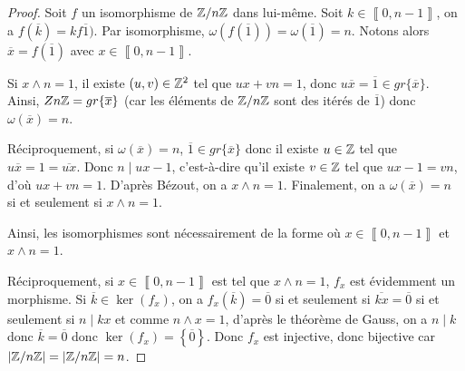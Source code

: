 \documentclass[12pt]{article}
\begin{document}
\begin{proof}
	Soit $f$ un isomorphisme de $\mathbb{Z}/n\mathbb{Z}$ dans lui-même. Soit $k\in\left\llbracket 0, n-1\right\rrbracket$, on a $f(\overline{k})=kf\overline{1})$. Par isomorphisme, $\omega(f(\overline{1}))=\omega(\overline{1})=n$. Notons alors $\overline{x}=f(\overline{1})$ avec $x\in\left\llbracket 0,n-1\right\rrbracket$.

	Si $x\wedge n=1$, il existe $(u,v)\in\mathbb{Z}^{2}$ tel que $ux+vn=1$, donc $u\overline{x}=\overline{1}\in gr\{\overline{x}\}$. Ainsi, $Z\/n\mathbb{Z}=gr\{\overline{x}\}$ (car les éléments de $\mathbb{Z}/n\mathbb{Z}$ sont des itérés de $\overline{1}$) donc $\omega(\overline{x})=n$.

	Réciproquement, si $\omega(\overline{x})=n$, $\overline{1}\in gr\{\overline{x}\}$ donc il existe $u\in\mathbb{Z}$ tel que $u\overline{x}=1=\overline{ux}$. Donc $n\mid ux-1$, c'est-à-dire qu'il existe $v\in\mathbb{Z}$ tel que $ux-1=vn$, d'où $ux+vn=1$. D'après Bézout, on a $x\wedge n=1$. Finalement, on a $\omega(\overline{x})=n$ si et seulement si $x\wedge n=1$.

	Ainsi, les isomorphismes sont nécessairement de la forme 
	où $x\in\left\llbracket 0,n-1\right\rrbracket$ et $x\wedge n=1$.

	Réciproquement, si $x\in\left\llbracket 0,n-1\right\rrbracket$ est tel que $x\wedge n=1$, $f_{x}$ est évidemment un morphisme. Si $\overline{k}\in\ker\left(f_{x}\right)$, on a $f_{x}\left(\overline{k}\right)=\overline{0}$ si et seulement si $\overline{kx}=\overline{0}$ si et seulement si $n\mid kx$ et comme $n\wedge x=1$, d'après le théorème de Gauss, on a $n\mid k$ donc $\overline{k}=\overline{0}$ donc $\ker\left(f_{x}\right)=\left\{\overline{0}\right\}$. Donc $f_{x}$ est injective, donc bijective car $\left\vert\mathbb{Z}/n\mathbb{Z}\right\vert=\left\vert\mathbb{Z}/n\mathbb{Z}\right\vert=n$.
\end{proof}
\end{document}
